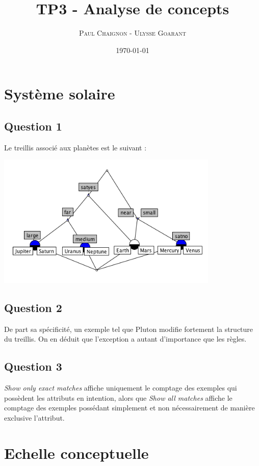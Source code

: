 \documentclass[a4paper,12pt]{article}
\title{TP3 - Analyse de concepts}
\author{\textsc{Paul Chaignon} - \textsc{Ulysse Goarant}}
\date{\today}
\begin{document}
\maketitle


\section{Système solaire}

\subsection*{Question 1}

Le treillis associé aux planètes est le suivant :

\includegraphics[width=400px]{question1.png}


\subsection*{Question 2}

De part sa spécificité, un exemple tel que Pluton modifie fortement la structure du treillis.
On en déduit que l'exception a autant d'importance que les règles.


\subsection*{Question 3}

\textit{Show only exact matches} affiche uniquement le comptage des exemples qui possèdent les attributs en intention, alors que \textit{Show all matches} affiche le comptage des exemples possédant simplement et non nécessairement de manière exclusive l'attribut.



\section{Echelle conceptuelle}
\end{document}

